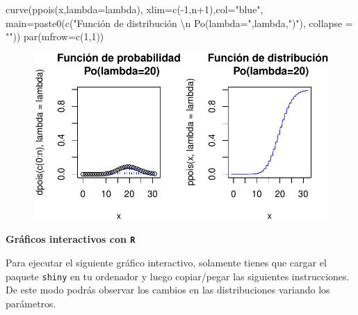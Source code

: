 \documentclass[
  letterpaper,
  DIV=11,
  numbers=noendperiod]{scrreprt}
\newenvironment{Shaded}{\begin{snugshade}}{\end{snugshade}}
\newcommand{\AttributeTok}[1]{\textcolor[rgb]{0.40,0.45,0.13}{#1}}
\newcommand{\DecValTok}[1]{\textcolor[rgb]{0.68,0.00,0.00}{#1}}
\newcommand{\FunctionTok}[1]{\textcolor[rgb]{0.28,0.35,0.67}{#1}}
\newcommand{\NormalTok}[1]{\textcolor[rgb]{0.00,0.23,0.31}{#1}}
\newcommand{\SpecialCharTok}[1]{\textcolor[rgb]{0.37,0.37,0.37}{#1}}
\newcommand{\StringTok}[1]{\textcolor[rgb]{0.13,0.47,0.30}{#1}}
\begin{document}
\begin{Shaded}
\begin{Highlighting}[]
\FunctionTok{curve}\NormalTok{(}\FunctionTok{ppois}\NormalTok{(x,}\AttributeTok{lambda=}\NormalTok{lambda),}
      \AttributeTok{xlim=}\FunctionTok{c}\NormalTok{(}\SpecialCharTok{{-}}\DecValTok{1}\NormalTok{,n}\SpecialCharTok{+}\DecValTok{1}\NormalTok{),}\AttributeTok{col=}\StringTok{"blue"}\NormalTok{,}
      \AttributeTok{main=}\FunctionTok{paste0}\NormalTok{(}\FunctionTok{c}\NormalTok{(}\StringTok{"Función de distribución }\SpecialCharTok{\textbackslash{}n}\StringTok{ Po(lambda="}\NormalTok{,lambda,}\StringTok{")"}\NormalTok{),}
                  \AttributeTok{collapse =} \StringTok{""}\NormalTok{))}
\FunctionTok{par}\NormalTok{(}\AttributeTok{mfrow=}\FunctionTok{c}\NormalTok{(}\DecValTok{1}\NormalTok{,}\DecValTok{1}\NormalTok{))}
\end{Highlighting}
\end{Shaded}

\begin{figure}

{\centering \includegraphics{3_files/figure-pdf/graficosPOISON-1.pdf}

}

\end{figure}

\textbf{Gráficos interactivos con \texttt{R}}

Para ejecutar el siguiente gráfico interactivo, solamente tienes que
cargar el paquete \texttt{shiny} en tu ordenador y luego copiar/pegar
las siguientes instrucciones. De este modo podrás observar los cambios
en las distribuciones variando los parámetros.
\end{document}
